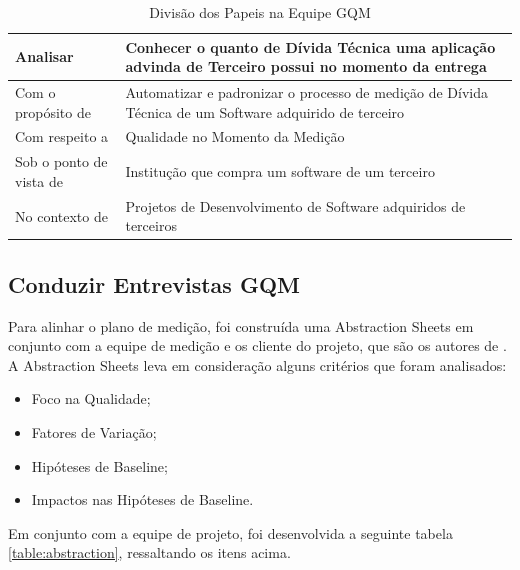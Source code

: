 \begin{table}[ht]
\caption{Divisão dos Papeis na Equipe GQM}
\centering
\begin{tabular}{|l|p{7cm}|}
\hline
Analisar & Conhecer o quanto de Dívida Técnica uma aplicação advinda de Terceiro
possui no momento da entrega \\
\hline
Com o propósito de & Automatizar e padronizar o processo de medição de Dívida
Técnica de um Software adquirido de terceiro \\
\hline
Com respeito a & Qualidade no Momento da Medição \\
\hline
Sob o ponto de vista de & Institução que compra um software de um terceiro  \\
\hline
No contexto de & Projetos de Desenvolvimento de Software adquiridos de terceiros \\
\hline
\end{tabular}
\label{table:templateobjetivo}
\end{table}

\subsection{Conduzir Entrevistas GQM}
Para alinhar o plano de medição, foi construída uma Abstraction Sheets em conjunto
com a equipe de medição e os cliente do projeto, que são os autores de \cite{td}.
A  Abstraction Sheets leva em consideração alguns critérios que foram analisados:

\begin{itemize}
  \item Foco na Qualidade;
  \item Fatores de Variação;
  \item Hipóteses de Baseline;
  \item Impactos nas Hipóteses de Baseline.
\end{itemize}

Em conjunto com a equipe de projeto, foi desenvolvida a seguinte tabela
\ref{table:abstraction}, ressaltando
os itens acima.
\\

